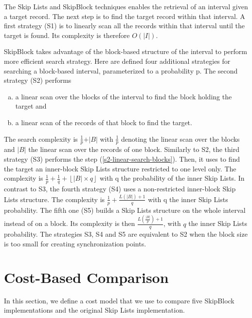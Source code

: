 The Skip Lists and SkipBlock techniques enables the retrieval of an interval
given a target record. The next step is to find the target record within that
interval. A first strategy (S1) is to linearly scan all the records within
that interval until the target is found. Its complexity is therefore $O(\vert I \vert)$.

SkipBlock takes advantage of the block-based structure of the
interval to perform more efficient search strategy. Here are defined four
additional strategies for searching a block-based interval, parameterized to a
probability p. The second strategy (S2) performs
\begin{enumerate}[(a)]
\item a linear scan over the blocks of the interval to find the block holding
the target and
\label{s2-linear-search-blocks}
\item a linear scan of the records of that block to find the target.
\label{s2-target-block}
\end{enumerate}
The search complexity is $\frac{1}{p}+\vert B \vert$ with $\frac{1}{p}$ denoting
the linear scan over the blocks and $\vert B \vert$ the linear scan over the
records of one block. Similarly to S2, the third strategy (S3) performs the
step (\ref{s2-linear-search-blocks}). Then, it uses to find the target an
inner-block Skip Lists structure restricted to one level only. The complexity
is $\frac{1}{p}+\frac{1}{q}+\left\lfloor\vert B\vert\times q\right\rfloor$
with q the probability of the inner Skip Lists. In contrast to S3, the fourth
strategy (S4) uses a non-restricted inner-block Skip Lists structure. The
complexity is $\frac{1}{p}+\frac{L(\vert B \vert)+1}{q}$ with q the inner Skip
Lists probability. The fifth one (S5) builds a Skip Lists structure on the
whole interval instead of on a block. Its complexity is then
$\frac{L\left(\frac{\vert B\vert}{p}\right)+1}{q}$, with $q$ the inner Skip
Lists probability. The strategies S3, S4 and S5 are equivalent to S2 when the
block size is too small for creating synchronization points.

\section{Cost-Based Comparison}
\label{sec:cost-based-cmp}

In this section, we define a cost model that we use to compare five
SkipBlock implementations and the original Skip Lists implementation.

